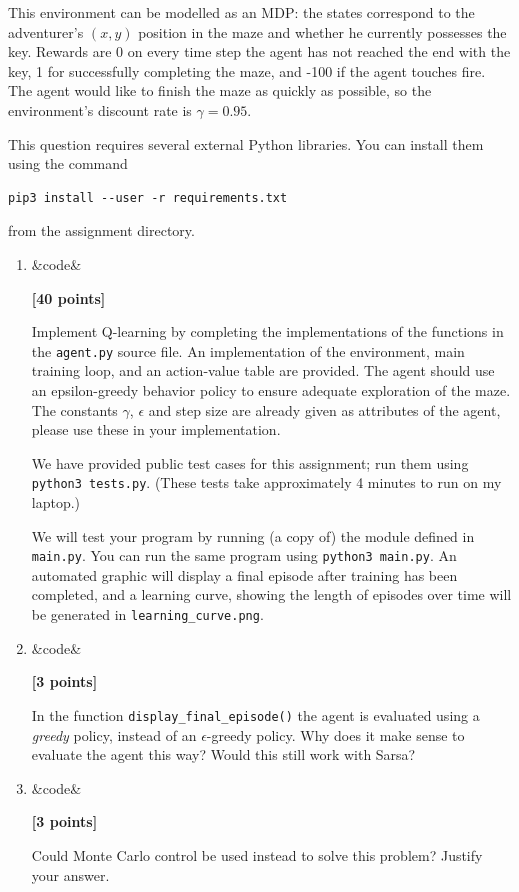 \documentclass{article}
\newcounter{totalpoints}
\newcommand{\points}[2][]{{\addtocounter{totalpoints}{#2}\ifx&#1&\else\addtocounter{#1}{#2}\fi\textbf{[#2 points]}}}
\begin{document}
\begin{enumerate}
This environment can be modelled as an MDP: the states correspond to the adventurer's $(x,y)$ position in the maze and whether he currently possesses the key. Rewards are 0 on every time step the agent has not reached the end with the key, 1 for successfully completing the maze, and -100 if the agent touches fire. The agent would like to finish the maze as quickly as possible, so the environment's discount rate is $\gamma = 0.95$.

This question requires several external Python libraries.  You can install them using the command
\begin{verbatim}
pip3 install --user -r requirements.txt
\end{verbatim}
from the assignment directory.

\begin{enumerate}
\item \points[code]{40}
Implement Q-learning by completing the implementations of the functions in the \verb|agent.py| source file.  An implementation of the environment, main training loop, and an action-value table are provided.
The agent should use an epsilon-greedy behavior policy to ensure adequate exploration of the maze. The constants $\gamma$, $\epsilon$ and step size are already given as attributes of the agent, please use these in your implementation.

We have provided public test cases for this assignment; run them using \verb|python3 tests.py|.
(These tests take approximately 4 minutes to run on my laptop.)

We will test your program by running (a copy of) the module defined in \verb|main.py|.  You can run the same program using \verb|python3 main.py|.  An automated graphic will display a final episode after training has been completed, and a learning curve, showing the length of episodes over time will be generated in \verb|learning_curve.png|.

\clearpage
\item \points[code]{3}
In the function \verb|display_final_episode()| the agent is evaluated using a \textit{greedy} policy, instead of an $\epsilon$-greedy policy.  Why does it make sense to evaluate the agent this way? Would this still work with Sarsa?
\begin{answer}{1.5in}
\end{answer}

\item \points[code]{3}
Could Monte Carlo control be used instead to solve this problem? Justify your answer.
\begin{answer}{1.5in}
\end{answer}
\end{enumerate}

\end{enumerate}
\end{document}
